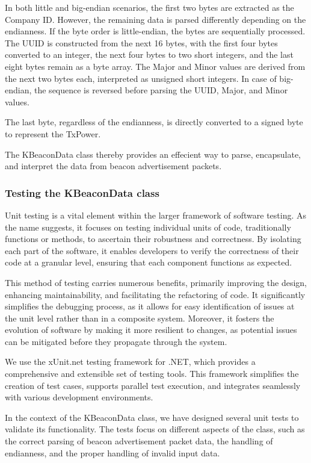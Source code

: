 In both little and big-endian scenarios, the first two bytes are extracted as the Company ID.
However, the remaining data is parsed differently depending on the endianness. If the byte order is little-endian, the bytes are sequentially processed. The UUID is constructed from the next 16 bytes, with the first four bytes converted to an integer, the next four bytes to two short integers, and the last eight bytes remain as a byte array. The Major and Minor values are derived from the next two bytes each, interpreted as unsigned short integers. In case of big-endian, the sequence is reversed before parsing the UUID, Major, and Minor values.

The last byte, regardless of the endianness, is directly converted to a signed byte to represent the TxPower.


The KBeaconData class thereby provides an effecient way to parse, encapsulate, and interpret the data from beacon advertisement packets.

\subsubsection{Testing the KBeaconData class}
Unit testing is a vital element within the larger framework of software testing. 
As the name suggests, it focuses on testing individual units of code, traditionally functions or methods, to ascertain their robustness and correctness. By isolating each part of the software, it enables developers to verify the correctness of their code at a granular level, ensuring that each component functions as expected.\cite{sommervilleSoftwareEngineering2016}

This method of testing carries numerous benefits, primarily improving the design, enhancing maintainability, and facilitating the refactoring of code. It significantly simplifies the debugging process, as it allows for easy identification of issues at the unit level rather than in a composite system. Moreover, it fosters the evolution of software by making it more resilient to changes, as potential issues can be mitigated before they propagate through the system.\cite{sommervilleSoftwareEngineering2016}

We use the xUnit.net testing framework for .NET, which provides a comprehensive and extensible set of testing tools. This framework simplifies the creation of test cases, supports parallel test execution, and integrates seamlessly with various development environments.\cite{xunitdotnet}

In the context of the KBeaconData class, we have designed several unit tests to validate its functionality. The tests focus on different aspects of the class, such as the correct parsing of beacon advertisement packet data, the handling of endianness, and the proper handling of invalid input data. 

